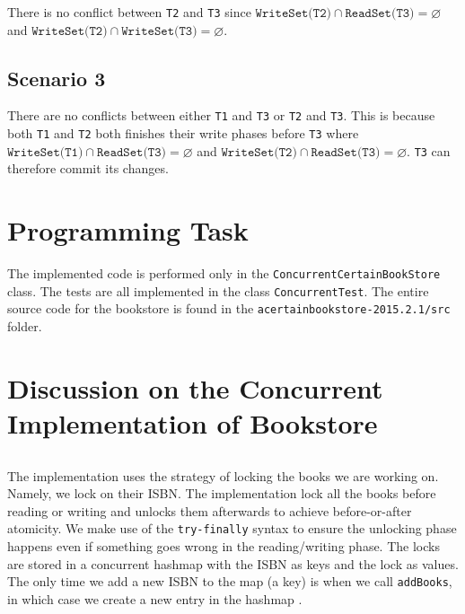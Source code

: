 \documentclass[a4paper]{article}
\begin{document}
There is no conflict between \texttt{T2} and \texttt{T3} since $\texttt{WriteSet(T2)} \cap \texttt{ReadSet(T3)} = \varnothing$ and $\texttt{WriteSet(T2)} \cap \texttt{WriteSet(T3)} = \varnothing$.
\subsection{Scenario 3}
There are no conflicts between either \texttt{T1} and \texttt{T3} or \texttt{T2} and \texttt{T3}. This is because both \texttt{T1} and \texttt{T2} both finishes their write phases before \texttt{T3} where $\texttt{WriteSet(T1)} \cap \texttt{ReadSet(T3)} = \varnothing$ and $\texttt{WriteSet(T2)} \cap \texttt{ReadSet(T3)} = \varnothing$. \texttt{T3} can therefore commit its changes.

\section{Programming Task}
The implemented code is performed only in the \texttt{ConcurrentCertainBookStore} class. The tests are all implemented in the class \texttt{ConcurrentTest}. The entire source code for the bookstore is found in the \texttt{acertainbookstore-2015.2.1/src} folder.

\section{Discussion on the Concurrent Implementation of Bookstore}
\subsection{}
The implementation uses the strategy of locking the books we are working on. Namely, we lock on their ISBN. The implementation lock all the books before reading or writing and unlocks them afterwards to achieve before-or-after atomicity. We make use of the \texttt{try-finally} syntax to ensure the unlocking phase happens even if something goes wrong in the reading/writing phase. The locks are stored in a concurrent hashmap with the ISBN as keys and the lock as values. The only time we add a new
ISBN to the map (a key) is when we call \texttt{addBooks}, in which case we create a new entry in the hashmap .
\end{document}
